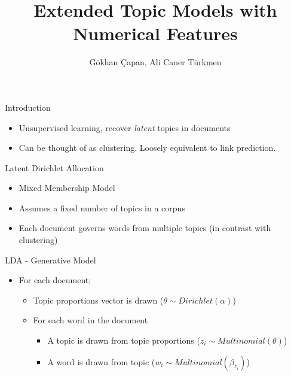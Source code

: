 \documentclass[pdf]{beamer}
\title{Extended Topic Models with Numerical Features}
\author{G\" okhan \c Capan, Ali Caner T\" urkmen}
\begin{document}
	
\begin{frame}
	\titlepage
\end{frame}

\begin{frame}{Introduction}
	
	\begin{itemize}
		\item Unsupervised learning, recover \emph{latent} topics in documents
		\item Can be thought of as clustering. Loosely equivalent to link prediction.
	\end{itemize}
\end{frame}

\begin{frame}{Latent Dirichlet Allocation}	
	\begin{itemize}
		\item Mixed Membership Model
		\item Assumes a fixed number of topics in a corpus
		\item Each document governs words from multiple topics (in contrast with clustering)
	\end{itemize}
\end{frame}

\begin{frame}{LDA - Generative Model}	
	\begin{itemize}
		\item For each document;
		\begin{itemize}
			\item Topic proportions vector is drawn ($\theta \sim Dirichlet(\alpha)$)
			\item For each word in the document
			\begin{itemize}
				\item A topic is drawn from topic proportions ($z_i \sim Multinomial(\theta)$)
				\item A word is drawn from topic ($w_i \sim Multinomial(\beta_{z_i})$)
			\end{itemize}
		\end{itemize}
	\end{itemize}
\end{frame}
\end{document}
